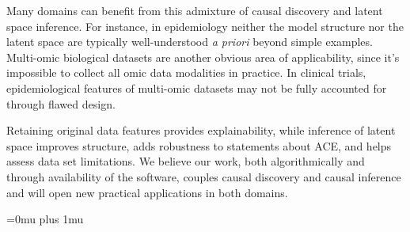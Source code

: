 \documentclass{article}
\begin{document}
Many domains can benefit from this admixture of causal discovery and latent space inference.  For instance, in epidemiology neither the model structure nor the latent space are typically well-understood \textit{a priori} beyond simple examples.  Multi-omic biological datasets are another obvious area of applicability, since it's impossible to collect all omic data modalities in practice.  In clinical trials, epidemiological features of multi-omic datasets may not be fully accounted for through flawed design.   

Retaining original data features provides explainability, while inference of latent space improves structure, adds robustness to statements about ACE, and helps assess data set limitations.  We believe our work, both algorithmically and through availability of the software, couples causal discovery and causal inference and will open new practical applications in both domains.

\clearpage
 
\small
\Urlmuskip=0mu plus 1mu\relax


\end{document}
